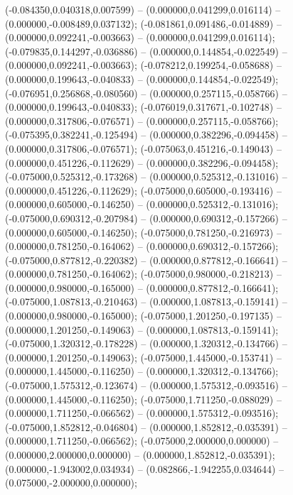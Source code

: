  (-0.084350,0.040318,0.007599) -- (0.000000,0.041299,0.016114) -- (0.000000,-0.008489,0.037132);
 (-0.081861,0.091486,-0.014889) -- (0.000000,0.092241,-0.003663) -- (0.000000,0.041299,0.016114);
 (-0.079835,0.144297,-0.036886) -- (0.000000,0.144854,-0.022549) -- (0.000000,0.092241,-0.003663);
 (-0.078212,0.199254,-0.058688) -- (0.000000,0.199643,-0.040833) -- (0.000000,0.144854,-0.022549);
 (-0.076951,0.256868,-0.080560) -- (0.000000,0.257115,-0.058766) -- (0.000000,0.199643,-0.040833);
 (-0.076019,0.317671,-0.102748) -- (0.000000,0.317806,-0.076571) -- (0.000000,0.257115,-0.058766);
 (-0.075395,0.382241,-0.125494) -- (0.000000,0.382296,-0.094458) -- (0.000000,0.317806,-0.076571);
 (-0.075063,0.451216,-0.149043) -- (0.000000,0.451226,-0.112629) -- (0.000000,0.382296,-0.094458);
 (-0.075000,0.525312,-0.173268) -- (0.000000,0.525312,-0.131016) -- (0.000000,0.451226,-0.112629);
 (-0.075000,0.605000,-0.193416) -- (0.000000,0.605000,-0.146250) -- (0.000000,0.525312,-0.131016);
 (-0.075000,0.690312,-0.207984) -- (0.000000,0.690312,-0.157266) -- (0.000000,0.605000,-0.146250);
 (-0.075000,0.781250,-0.216973) -- (0.000000,0.781250,-0.164062) -- (0.000000,0.690312,-0.157266);
 (-0.075000,0.877812,-0.220382) -- (0.000000,0.877812,-0.166641) -- (0.000000,0.781250,-0.164062);
 (-0.075000,0.980000,-0.218213) -- (0.000000,0.980000,-0.165000) -- (0.000000,0.877812,-0.166641);
 (-0.075000,1.087813,-0.210463) -- (0.000000,1.087813,-0.159141) -- (0.000000,0.980000,-0.165000);
 (-0.075000,1.201250,-0.197135) -- (0.000000,1.201250,-0.149063) -- (0.000000,1.087813,-0.159141);
 (-0.075000,1.320312,-0.178228) -- (0.000000,1.320312,-0.134766) -- (0.000000,1.201250,-0.149063);
 (-0.075000,1.445000,-0.153741) -- (0.000000,1.445000,-0.116250) -- (0.000000,1.320312,-0.134766);
 (-0.075000,1.575312,-0.123674) -- (0.000000,1.575312,-0.093516) -- (0.000000,1.445000,-0.116250);
 (-0.075000,1.711250,-0.088029) -- (0.000000,1.711250,-0.066562) -- (0.000000,1.575312,-0.093516);
 (-0.075000,1.852812,-0.046804) -- (0.000000,1.852812,-0.035391) -- (0.000000,1.711250,-0.066562);
 (-0.075000,2.000000,0.000000) -- (0.000000,2.000000,0.000000) -- (0.000000,1.852812,-0.035391);
 (0.000000,-1.943002,0.034934) -- (0.082866,-1.942255,0.034644) -- (0.075000,-2.000000,0.000000);
